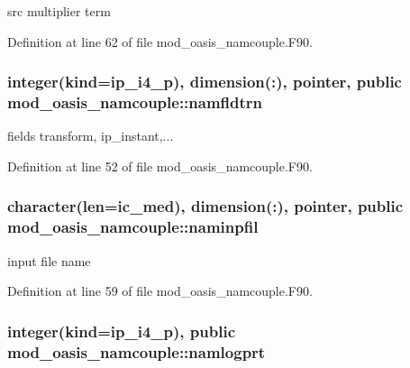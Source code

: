 src multiplier term 



Definition at line 62 of file mod\+\_\+oasis\+\_\+namcouple.\+F90.

\hypertarget{classmod__oasis__namcouple_a5f81bc00e6dc045770edd4093f68278c}{
\subsubsection[{namfldtrn}]{\setlength{\rightskip}{0pt plus 5cm}integer(kind=ip\+\_\+i4\+\_\+p), dimension(\+:), pointer, public mod\+\_\+oasis\+\_\+namcouple\+::namfldtrn}}\label{classmod__oasis__namcouple_a5f81bc00e6dc045770edd4093f68278c}


fields transform, ip\+\_\+instant,... 



Definition at line 52 of file mod\+\_\+oasis\+\_\+namcouple.\+F90.

\hypertarget{classmod__oasis__namcouple_a15fc11ff1c1d5718ff127a06a205a82c}{
\subsubsection[{naminpfil}]{\setlength{\rightskip}{0pt plus 5cm}character(len=ic\+\_\+med), dimension(\+:), pointer, public mod\+\_\+oasis\+\_\+namcouple\+::naminpfil}}\label{classmod__oasis__namcouple_a15fc11ff1c1d5718ff127a06a205a82c}


input file name 



Definition at line 59 of file mod\+\_\+oasis\+\_\+namcouple.\+F90.

\hypertarget{classmod__oasis__namcouple_a46affda5336f60a1eeb1badaaccd3cfd}{
\subsubsection[{namlogprt}]{\setlength{\rightskip}{0pt plus 5cm}integer(kind=ip\+\_\+i4\+\_\+p), public mod\+\_\+oasis\+\_\+namcouple\+::namlogprt}}\label{classmod__oasis__namcouple_a46affda5336f60a1eeb1badaaccd3cfd}


